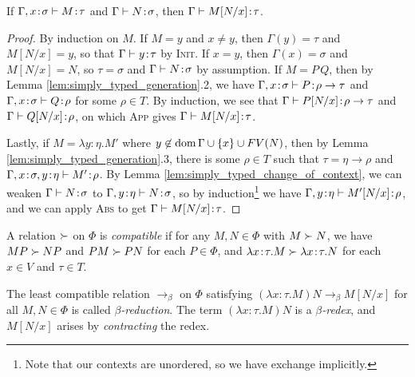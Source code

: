 \documentclass[reqno]{amsart}
\begin{document}
    \begin{lemma}\label{lem:simply_typed_substitution}
        If $\Gamma,x\!:\!\sigma\vdash M\!:\!\tau$ and $\Gamma\vdash N\!:\!\sigma$, then $\Gamma\vdash M[N/x]\!:\!\tau$.
    \end{lemma}
    \begin{proof}
        By induction on $M$. If $M=y$ and $x\neq y$, then $\Gamma(y)=\tau$ and $M[N/x]=y$, so that $\Gamma\vdash y\!:\!\tau$ by \textsc{Init}. If $x=y$, then $\Gamma(x)=\sigma$ and $M[N/x]=N$, so $\tau=\sigma$ and $\Gamma\vdash N\!:\!\sigma$ by assumption. If $M=P\,Q$, then by Lemma \ref{lem:simply_typed_generation}.2, we have $\Gamma,x\!:\!\sigma\vdash P\!:\!\rho\rightarrow\tau$ and $\Gamma,x\!:\!\sigma\vdash Q\!:\!\rho$ for some $\rho\in T$. By induction, we see that $\Gamma\vdash P[N/x]\!:\!\rho\to\tau$ and $\Gamma\vdash Q[N/x]\!:\!\rho$, on which \textsc{App} gives $\Gamma\vdash M[N/x]\!:\!\tau$.

        Lastly, if $M=\lambda y\!:\!\eta.M'$ where $y\not\in\operatorname{dom}\Gamma\cup\left\{x\right\}\cup FV(N)$, then by Lemma \ref{lem:simply_typed_generation}.3, there is some $\rho\in T$ such that $\tau=\eta\rightarrow\rho$ and $\Gamma,x\!:\!\sigma,y\!:\!\eta\vdash M'\!:\!\rho$. By Lemma \ref{lem:simply_typed_change_of_context}, we can weaken $\Gamma\vdash N\!:\!\sigma$ to $\Gamma,y\!:\!\eta\vdash N\!:\!\sigma$, so by induction\footnote{Note that our contexts are unordered, so we have exchange implicitly.} we have $\Gamma,y\!:\!\eta\vdash M'[N/x]\!:\!\rho$, and we can apply \textsc{Abs} to get $\Gamma\vdash M[N/x]\!:\!\tau$.
    \end{proof}

    \begin{definition}
        A relation $\succ$ on $\Phi$ is \textit{compatible} if for any $M,N\in\Phi$ with $M\succ N$, we have $MP\succ NP$ and $PM\succ PN$ for each $P\in\Phi$, and $\lambda x\!:\!\tau.M\succ\lambda x\!:\!\tau.N$ for each $x\in V$ and $\tau\in T$.
    \end{definition}

    \begin{definition}
        The least compatible relation $\rightarrow_\beta$ on $\Phi$ satisfying $(\lambda x\!:\!\tau.M)N\rightarrow_\beta M[N/x]$ for all $M,N\in\Phi$ is called \textit{$\beta$-reduction}. The term $(\lambda x\!:\!\tau.M)N$ is a \textit{$\beta$-redex}, and $M[N/x]$ arises by \textit{contracting} the redex.
    \end{definition}
\end{document}

